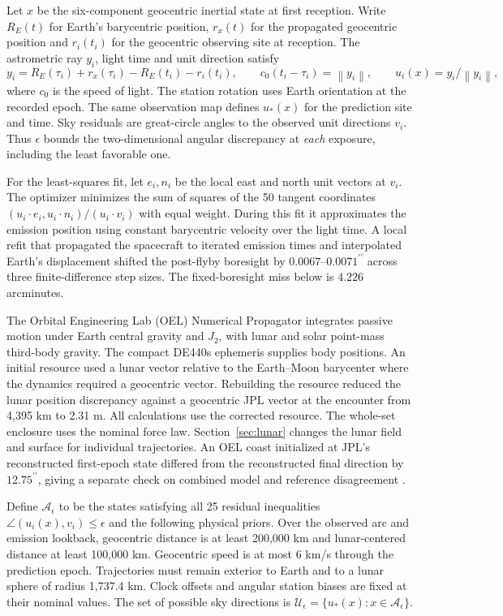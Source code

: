 \documentclass[10pt,letterpaper]{article}
\newcommand{\as}{^{\prime\prime}}
\newcommand{\norm}[1]{\left\lVert #1\right\rVert}
\newcommand{\dotp}{\mathbin{\cdot}}
\begin{document}
Let $x$ be the six-component geocentric inertial state at first reception. Write $R_E(t)$ for Earth's barycentric position, $r_x(t)$ for the propagated geocentric position and $r_i(t_i)$ for the geocentric observing site at reception. The astrometric ray $y_i$, light time and unit direction satisfy
\begin{equation}
 y_i=R_E(\tau_i)+r_x(\tau_i)-R_E(t_i)-r_i(t_i),\qquad
 c_0(t_i-\tau_i)=\norm{y_i},\qquad u_i(x)=y_i/\norm{y_i},
 \label{eq:light}
\end{equation}
where $c_0$ is the speed of light. The station rotation uses Earth orientation at the recorded epoch. The same observation map defines $u_*(x)$ for the prediction site and time. Sky residuals are great-circle angles to the observed unit directions $v_i$. Thus $\epsilon$ bounds the two-dimensional angular discrepancy at \emph{each} exposure, including the least favorable one.

For the least-squares fit, let $e_i,n_i$ be the local east and north unit vectors at $v_i$. The optimizer minimizes the sum of squares of the 50 tangent coordinates $(u_i\dotp e_i,u_i\dotp n_i)/(u_i\dotp v_i)$ with equal weight. During this fit it approximates the emission position using constant barycentric velocity over the light time. A local refit that propagated the spacecraft to iterated emission times and interpolated Earth's displacement shifted the post-flyby boresight by $0.0067$--$0.0071\as$ across three finite-difference step sizes. The fixed-boresight miss below is $4.226$ arcminutes.

The Orbital Engineering Lab (OEL) Numerical Propagator integrates passive motion under Earth central gravity and $J_2$, with lunar and solar point-mass third-body gravity. The compact DE440s ephemeris supplies body positions. An initial resource used a lunar vector relative to the Earth--Moon barycenter where the dynamics required a geocentric vector. Rebuilding the resource reduced the lunar position discrepancy against a geocentric JPL vector at the encounter from 4,395 km to 2.31 m. All calculations use the corrected resource. The whole-set enclosure uses the nominal force law. Section~\ref{sec:lunar} changes the lunar field and surface for individual trajectories. An OEL coast initialized at JPL's reconstructed first-epoch state differed from the reconstructed final direction by $12.75\as$, giving a separate check on combined model and reference disagreement \cite{horizons}.

Define $\mathcal A_\epsilon$ to be the states satisfying all 25 residual inequalities $\angle(u_i(x),v_i)\leq\epsilon$ and the following physical priors. Over the observed arc and emission lookback, geocentric distance is at least 200,000 km and lunar-centered distance at least 100,000 km. Geocentric speed is at most 6 km/s through the prediction epoch. Trajectories must remain exterior to Earth and to a lunar sphere of radius 1,737.4 km. Clock offsets and angular station biases are fixed at their nominal values. The set of possible sky directions is $\mathcal U_\epsilon=\{u_*(x):x\in\mathcal A_\epsilon\}$.
\end{document}
